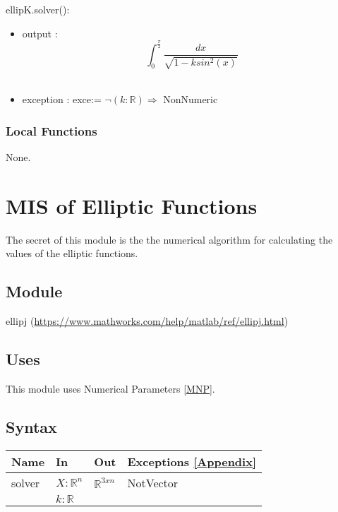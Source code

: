 \documentclass[12pt, titlepage]{article}
\begin{document}
\noindent ellipK.solver():
\begin{itemize}
	\item output : \\
	$$ 
	\int_{0}^{\frac{\pi}{2}} \frac{dx}{\sqrt{1-ksin^{2}(x)}}$$ \\
	\item exception : exce:= $\neg(k : \mathbb{R}) \Rightarrow$ 
	NonNumeric
\end{itemize}

\subsubsection{Local Functions} 

None. 

\newpage

\section{MIS of Elliptic Functions} \label{MELF}

The secret of this module is the the numerical algorithm for calculating the 
values of the elliptic functions.

\subsection{Module}

ellipj (\url{https://www.mathworks.com/help/matlab/ref/ellipj.html})

\subsection{Uses}

This module uses Numerical Parameters \ref{MNP}. 

\subsection{Syntax}

\begin{center}
	\begin{tabular}{p{2cm} p{4cm} p{4cm} p{3cm}}
		\hline
		\textbf{Name} & \textbf{In} & \textbf{Out} & \textbf{Exceptions} 
		\ref{Appendix}\\
		\hline
		solver & $X : \mathbb{R}^{n}$ & $\mathbb{R}^{3xn}$ & 
		NotVector \\ 
		 & $k : \mathbb{R}$ &  &  \\ 
		\hline
	\end{tabular}
\end{center}
\end{document}
